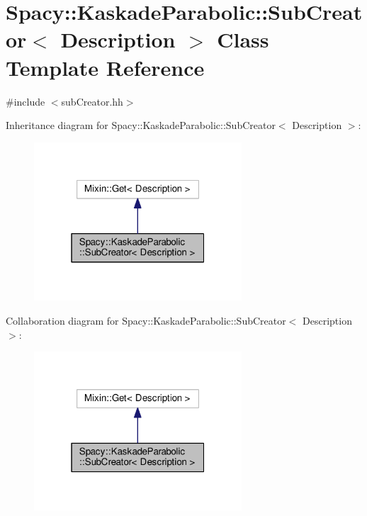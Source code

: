 \hypertarget{classSpacy_1_1KaskadeParabolic_1_1SubCreator}{\section{Spacy\-:\-:Kaskade\-Parabolic\-:\-:Sub\-Creator$<$ Description $>$ Class Template Reference}
\label{classSpacy_1_1KaskadeParabolic_1_1SubCreator}
}


{\ttfamily \#include $<$sub\-Creator.\-hh$>$}



Inheritance diagram for Spacy\-:\-:Kaskade\-Parabolic\-:\-:Sub\-Creator$<$ Description $>$\-:
\nopagebreak
\begin{figure}[H]
\begin{center}
\leavevmode
\includegraphics[width=220pt]{classSpacy_1_1KaskadeParabolic_1_1SubCreator__inherit__graph}
\end{center}
\end{figure}


Collaboration diagram for Spacy\-:\-:Kaskade\-Parabolic\-:\-:Sub\-Creator$<$ Description $>$\-:
\nopagebreak
\begin{figure}[H]
\begin{center}
\leavevmode
\includegraphics[width=220pt]{classSpacy_1_1KaskadeParabolic_1_1SubCreator__coll__graph}
\end{center}
\end{figure}

